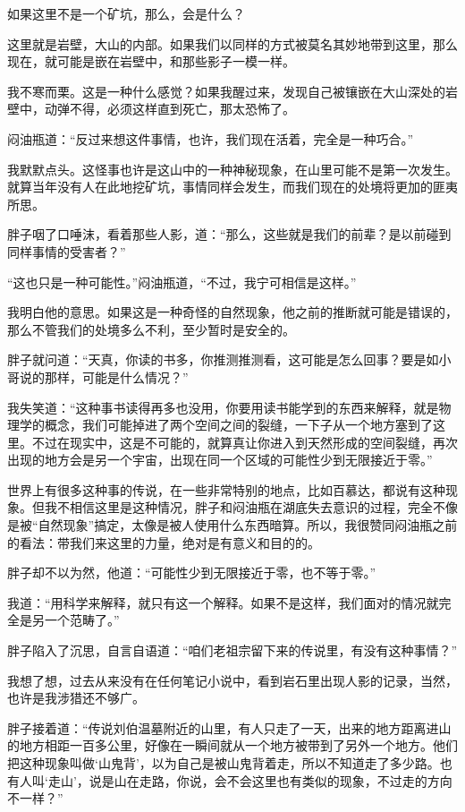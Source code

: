 如果这里不是一个矿坑，那么，会是什么？

这里就是岩壁，大山的内部。如果我们以同样的方式被莫名其妙地带到这里，那么现在，就可能是嵌在岩壁中，和那些影子一模一样。

我不寒而栗。这是一种什么感觉？如果我醒过来，发现自己被镶嵌在大山深处的岩壁中，动弹不得，必须这样直到死亡，那太恐怖了。

闷油瓶道：“反过来想这件事情，也许，我们现在活着，完全是一种巧合。”

我默默点头。这怪事也许是这山中的一种神秘现象，在山里可能不是第一次发生。就算当年没有人在此地挖矿坑，事情同样会发生，而我们现在的处境将更加的匪夷所思。

胖子咽了口唾沫，看着那些人影，道：“那么，这些就是我们的前辈？是以前碰到同样事情的受害者？”

“这也只是一种可能性。”闷油瓶道，“不过，我宁可相信是这样。”

我明白他的意思。如果这是一种奇怪的自然现象，他之前的推断就可能是错误的，那么不管我们的处境多么不利，至少暂时是安全的。

胖子就问道：“天真，你读的书多，你推测推测看，这可能是怎么回事？要是如小哥说的那样，可能是什么情况？”

我失笑道：“这种事书读得再多也没用，你要用读书能学到的东西来解释，就是物理学的概念，我们可能掉进了两个空间之间的裂缝，一下子从一个地方塞到了这里。不过在现实中，这是不可能的，就算真让你进入到天然形成的空间裂缝，再次出现的地方会是另一个宇宙，出现在同一个区域的可能性少到无限接近于零。”

世界上有很多这种事的传说，在一些非常特别的地点，比如百慕达，都说有这种现象。但我不相信这里是这种情况，胖子和闷油瓶在湖底失去意识的过程，完全不像是被“自然现象”搞定，太像是被人使用什么东西暗算。所以，我很赞同闷油瓶之前的看法：带我们来这里的力量，绝对是有意义和目的的。

胖子却不以为然，他道：“可能性少到无限接近于零，也不等于零。”

我道：“用科学来解释，就只有这一个解释。如果不是这样，我们面对的情况就完全是另一个范畴了。”

胖子陷入了沉思，自言自语道：“咱们老祖宗留下来的传说里，有没有这种事情？”

我想了想，过去从来没有在任何笔记小说中，看到岩石里出现人影的记录，当然，也许是我涉猎还不够广。

胖子接着道：“传说刘伯温墓附近的山里，有人只走了一天，出来的地方距离进山的地方相距一百多公里，好像在一瞬间就从一个地方被带到了另外一个地方。他们把这种现象叫做‘山鬼背’，以为自己是被山鬼背着走，所以不知道走了多少路。也有人叫‘走山’，说是山在走路，你说，会不会这里也有类似的现象，不过走的方向不一样？”

